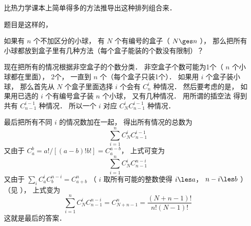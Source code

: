 
比热力学课本上简单得多的方法推导出这种排列组合来．

题目是这样的， 

如果有 $n$ 个不加区分的小球， 有 $N$ 个有编号的盒子（ $N \ges n$ ）， 那么把所有小球都放到盒子里有几种方法（每个盒子能装的个数没有限制）？

现在把所有的情况根据非空盒子的个数分类． 非空盒子个数可能为1个（ $n$ 个小球都在里面）， 2个， 一直到 $n$ 个（每个盒子只装1个）． 如果用 $i$ 个盒子装小球， 那么首先从 $N$ 个盒子里面选择 $i$ 个会有 $C_n^i$ 种情况． 然后要考虑的是， 如果用已选的 $i$ 个有编号盒子装 $n$ 个小球， 又有几种情况． 用所谓的插空法%
得到共有 $C_{n-1}^{i-1}$ 种情况． 所以一个 $i$ 对应 $C_N^i C_{n-1}^{i-1}$ 种情况．

最后把所有不同 $i$ 的情况数加在一起， 得出所有情况的总数为
\begin{equation}
\sum_{i = 1}^n C_N^i C_{n-1}^{i-1}
\end{equation}
又由于 $C_a^b = a!/[(a-b)!b!] = C_a^{a-b}$， 上式可变为
\begin{equation}
\sum_{i=1}^n  C_N^i C_{n-1}^{n-i}
\end{equation}
又由于 $\sum_i C_a^i C_b^{n-i} = C_{a+b}^n$ （ $i$ 取所有可能的整数使得 $i \les a$，  $n - i \les b$  ）（见%
）， 上式变为
\begin{equation}
\sum_{i=1}^n C_N^i C_{n-1}^{n-i} = C_{N+n-1}^n = \frac{(N+n-1)!}{n!(N - 1)!}
\end{equation}
这就是最后的答案．

